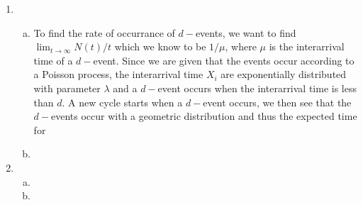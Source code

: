 \documentclass[a4paper,10pt]{article}
\theoremstyle{definition}
\begin{document}
\begin{enumerate}
\item
\begin{enumerate}[(a)]
\item To find the rate of occurrance of $d-$events, we want to find $\lim_{t\to\infty}N(t)/t$ which we know to be $1/\mu$, where $\mu$ is the interarrival time of a $d-$event. Since we are given that the events occur according to a Poisson process, the interarrival time $X_i$ are exponentially distributed with parameter $\lambda$ and a $d-$event occurs when the interarrival time is less than $d$. A new cycle starts when a $d-$event occurs, we then see that the $d-$events occur with a geometric distribution and thus the expected time for 
\item
\end{enumerate}


\item 
\begin{enumerate}[(a)]
\item 
\item
\end{enumerate}

\end{enumerate}
\end{document}
